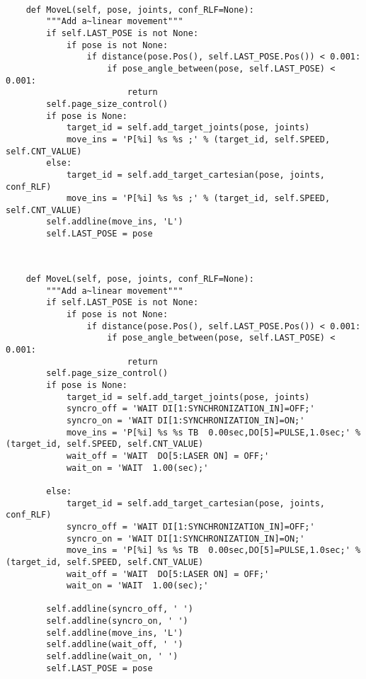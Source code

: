 \begin{lstlisting}[numbers=none,caption={Code snippet of original MoveL method},captionpos=b,label={code:originalMoveL}, language={}]

    def MoveL(self, pose, joints, conf_RLF=None):
        """Add a~linear movement"""
        if self.LAST_POSE is not None:
            if pose is not None:
                if distance(pose.Pos(), self.LAST_POSE.Pos()) < 0.001:
                    if pose_angle_between(pose, self.LAST_POSE) < 0.001:
                        return
        self.page_size_control()
        if pose is None:
            target_id = self.add_target_joints(pose, joints)
            move_ins = 'P[%i] %s %s ;' % (target_id, self.SPEED, self.CNT_VALUE)
        else:
            target_id = self.add_target_cartesian(pose, joints, conf_RLF)
            move_ins = 'P[%i] %s %s ;' % (target_id, self.SPEED, self.CNT_VALUE)
        self.addline(move_ins, 'L')
        self.LAST_POSE = pose


\end{lstlisting}


\begin{lstlisting}[numbers=none,caption={Code snippet of modified MoveL method},captionpos=b,label={code:modifiedMoveL}, language={}]

    def MoveL(self, pose, joints, conf_RLF=None):
        """Add a~linear movement"""
        if self.LAST_POSE is not None:
            if pose is not None:
                if distance(pose.Pos(), self.LAST_POSE.Pos()) < 0.001:
                    if pose_angle_between(pose, self.LAST_POSE) < 0.001:
                        return
        self.page_size_control()
        if pose is None:
            target_id = self.add_target_joints(pose, joints)
            syncro_off = 'WAIT DI[1:SYNCHRONIZATION_IN]=OFF;'
            syncro_on = 'WAIT DI[1:SYNCHRONIZATION_IN]=ON;'
            move_ins = 'P[%i] %s %s TB  0.00sec,DO[5]=PULSE,1.0sec;' % (target_id, self.SPEED, self.CNT_VALUE)
            wait_off = 'WAIT  DO[5:LASER ON] = OFF;'
            wait_on = 'WAIT  1.00(sec);'
            
        else:
            target_id = self.add_target_cartesian(pose, joints, conf_RLF)
            syncro_off = 'WAIT DI[1:SYNCHRONIZATION_IN]=OFF;'
            syncro_on = 'WAIT DI[1:SYNCHRONIZATION_IN]=ON;'
            move_ins = 'P[%i] %s %s TB  0.00sec,DO[5]=PULSE,1.0sec;' % (target_id, self.SPEED, self.CNT_VALUE)
            wait_off = 'WAIT  DO[5:LASER ON] = OFF;'
            wait_on = 'WAIT  1.00(sec);'
            
        self.addline(syncro_off, ' ')
        self.addline(syncro_on, ' ')
        self.addline(move_ins, 'L')
        self.addline(wait_off, ' ')
        self.addline(wait_on, ' ')
        self.LAST_POSE = pose


\end{lstlisting}


